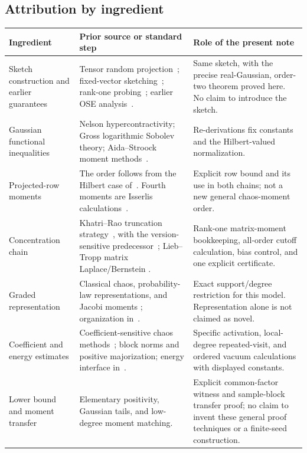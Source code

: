 \documentclass[11pt]{article}
\numberwithin{equation}{section}
\theoremstyle{definition}\newtheorem{definition}[theorem]{Definition}
\theoremstyle{remark}\newtheorem{remark}[theorem]{Remark}
\begin{document}
\clearpage
\subsection{Attribution by ingredient}\label{sec:provenance-table}
\begingroup\small\setlength{\tabcolsep}{5pt}\renewcommand{\arraystretch}{1.2}
\begin{tabular}{@{}P{.23\textwidth}P{.36\textwidth}P{.34\textwidth}@{}}
\toprule
\textbf{Ingredient}&\textbf{Prior source or standard step}&\textbf{Role of the present note}\\
\midrule
Sketch construction and earlier guarantees &
Tensor random projection~\cite{Sun}; fixed-vector sketching~\cite{Ahle};
rank-one probing~\cite{BK}; earlier OSE analysis~\cite{BGKL,BM}. &
Same sketch, with the precise real-Gaussian, order-two theorem proved here.
No claim to introduce the sketch.\\
Gaussian functional inequalities &
Nelson hypercontractivity; Gross logarithmic Sobolev theory;
Aida--Stroock moment methods~\cite{Nelson,Gross,GrossSurvey,AidaStroock}. &
Re-derivations fix constants and the Hilbert-valued normalization.\\
Projected-row moments &
The order follows from the Hilbert case of~\cite[Corollary~12]{ALM}.
Fourth moments are Isserlis calculations~\cite{Isserlis}. &
Explicit row bound and its use in both chains; not a new general chaos-moment
order.\\
Concentration chain &
Khatri--Rao truncation strategy~\cite{BM}, with the version-sensitive
predecessor~\cite{SVBv1,SVBv2}; Lieb--Tropp matrix Laplace/Bernstein
\cite{Lieb,Tropp}. &
Rank-one matrix-moment bookkeeping, all-order cutoff calculation, bias control,
and one explicit certificate.\\
Graded representation &
Classical chaos, probability-law representations, and Jacobi moments
\cite{Wiener,AccardiBozejko,GolubWelsch}; organization in~\cite{Framework}. &
Exact support/degree restriction for this model. Representation alone is not
claimed as novel.\\
Coefficient and energy estimates &
Coefficient-sensitive chaos methods~\cite{ALM,BLNvH}; block norms and positive
majorization; energy interface in~\cite{Framework}. &
Specific activation, local-degree repeated-visit, and ordered vacuum
calculations with displayed constants.\\
Lower bound and moment transfer &
Elementary positivity, Gaussian tails, and low-degree moment matching. &
Explicit common-factor witness and sample-block transfer proof; no claim to
invent these general proof techniques or a finite-seed construction.\\
\bottomrule
\end{tabular}
\endgroup
\end{document}
